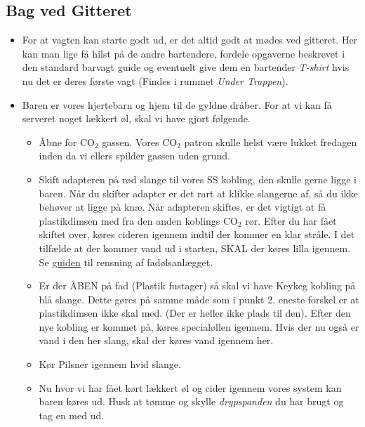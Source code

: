 \subsection{Bag ved Gitteret}
\label{sec:pre:bag-ved-gitteret}
\begin{itemize}
    \item For at vagten kan starte godt ud, er det altid godt at mødes ved gitteret.
    Her kan man lige få hilst på de andre bartendere, fordele opgaverne beskrevet i den standard
    barvagt guide og eventuelt give dem en bartender \textit{T-shirt} hvis nu det er deres første vagt
    (Findes i rummet \textit{Under Trappen}).
    \item Baren er vores hjertebarn og hjem til de gyldne dråber.
    For at vi kan få serveret noget lækkert øl, skal vi have gjort følgende.
    \begin{itemize}
        \item Åbne for CO$_2$ gassen. Vores CO$_2$ patron skulle helst være lukket fredagen
        inden da vi ellers spilder gassen uden grund.
        \item Skift adapteren på rød slange til vores SS kobling, den skulle gerne ligge i baren.
        Når du skifter adapter er det rart at klikke slangerne af, så du ikke behøver at ligge på knæ.
        Når adapteren skiftes, er det vigtigt at få plastikdimsen med fra den anden koblings CO$_2$ rør.
        Efter du har fået skiftet over, køres cideren igennem indtil der kommer en klar stråle.
        I det tilfælde at der kommer vand ud i starten, SKAL der køres lilla igennem.
        Se \href{https://media.fredagscafeen.dk/guides/rensningafanlaeg.pdf}{guiden} til rensning af fadølsanlægget.
        \item Er der ÅBEN på fad (Plastik fustager) så skal vi have Keykeg kobling på blå slange.
        Dette gøres på samme måde som i punkt 2. eneste forskel er at plastikdimsen ikke skal med.
        (Der er heller ikke plads til den).
        Efter den nye kobling er kommet på, køres specialøllen igennem.
        Hvis der nu også er vand i den her slang, skal der køres vand igennem her.
        \item Kør Pilsner igennem hvid slange.
        \item Nu hvor vi har fået kørt lækkert øl og cider igennem vores system kan baren køres ud.
        Husk at tømme og skylle \textit{drypspanden} du har brugt og tag en med ud.
    \end{itemize}
\end{itemize}

